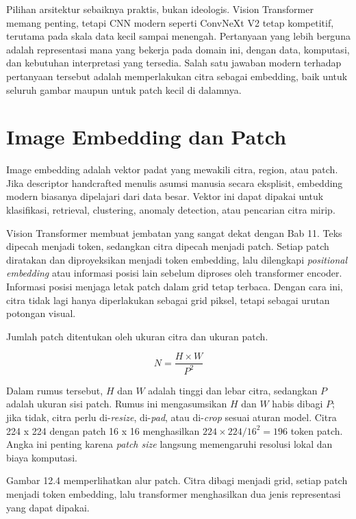 Pilihan arsitektur sebaiknya praktis, bukan ideologis. Vision Transformer memang penting, tetapi CNN modern seperti ConvNeXt V2 tetap kompetitif, terutama pada skala data kecil sampai menengah. Pertanyaan yang lebih berguna adalah representasi mana yang bekerja pada domain ini, dengan data, komputasi, dan kebutuhan interpretasi yang tersedia. Salah satu jawaban modern terhadap pertanyaan tersebut adalah memperlakukan citra sebagai embedding, baik untuk seluruh gambar maupun untuk patch kecil di dalamnya.

\section{Image Embedding dan Patch}\label{image-embedding-dan-patch}

Image embedding adalah vektor padat yang mewakili citra, region, atau patch. Jika descriptor handcrafted menulis asumsi manusia secara eksplisit, embedding modern biasanya dipelajari dari data besar. Vektor ini dapat dipakai untuk klasifikasi, retrieval, clustering, anomaly detection, atau pencarian citra mirip.

Vision Transformer membuat jembatan yang sangat dekat dengan Bab 11. Teks dipecah menjadi token, sedangkan citra dipecah menjadi patch. Setiap patch diratakan dan diproyeksikan menjadi token embedding, lalu dilengkapi \emph{positional embedding} atau informasi posisi lain sebelum diproses oleh transformer encoder. Informasi posisi menjaga letak patch dalam grid tetap terbaca. Dengan cara ini, citra tidak lagi hanya diperlakukan sebagai grid piksel, tetapi sebagai urutan potongan visual.

Jumlah patch ditentukan oleh ukuran citra dan ukuran patch.

\[
N = \dfrac{H \times W}{P^2}
\]

Dalam rumus tersebut, \(H\) dan \(W\) adalah tinggi dan lebar citra, sedangkan \(P\) adalah ukuran sisi patch. Rumus ini mengasumsikan \(H\) dan \(W\) habis dibagi \(P\); jika tidak, citra perlu di-\emph{resize}, di-\emph{pad}, atau di-\emph{crop} sesuai aturan model. Citra 224 x 224 dengan patch 16 x 16 menghasilkan \(224 \times 224 / 16^2 = 196\) token patch. Angka ini penting karena \emph{patch size} langsung memengaruhi resolusi lokal dan biaya komputasi.

Gambar 12.4 memperlihatkan alur patch. Citra dibagi menjadi grid, setiap patch menjadi token embedding, lalu transformer menghasilkan dua jenis representasi yang dapat dipakai.

